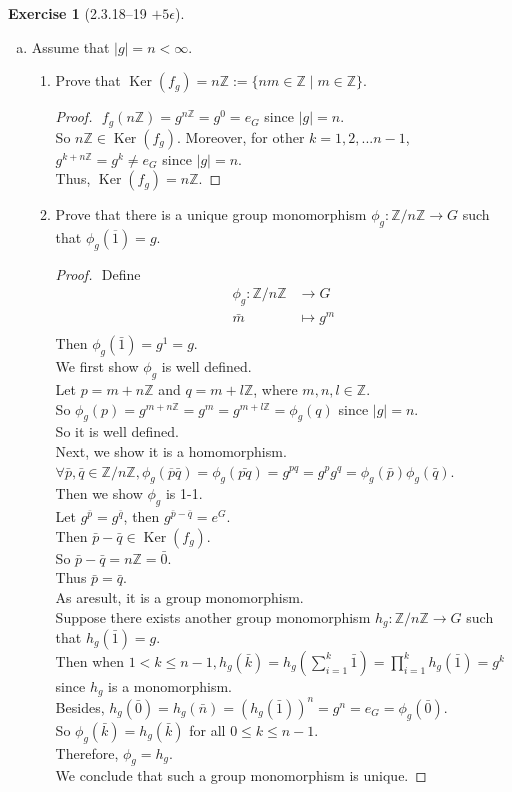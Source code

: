 \documentclass{amsart}
\newcommand{\bbz}{\mathbb{Z}}
\renewcommand{\ker}{\operatorname{Ker}}
\theoremstyle{plain}
\theoremstyle{definition}
\newtheorem{exer}[lem]{Exercise}
\begin{document}
\begin{exer}[2.3.18--19 $+5\epsilon$]
\begin{enumerate}[(a)]
\item Assume that $|g|=n<\infty$.
\begin{enumerate}[(1)]
\item Prove that $\ker(f_g)=n\bbz:=\{nm\in\bbz\mid m\in\bbz\}$.
	\begin{proof}
		$ $\newline
		$f_g(n\bbz) = g^{n\bbz} = g^0 = e_G$ since $|g| = n$.\\
		So $n\bbz \in \ker(f_g)$.
		Moreover, for other $k = 1,2,...n-1$, $g^{k+n\bbz} = g^k \neq e_G$ since $|g| = n$.\\
		Thus, $\ker(f_g) = n\bbz$.
	\end{proof}
\item Prove that 
there is a unique group monomorphism $\phi_g\colon\bbz/n\bbz\to G$ such that $\phi_g(\overline 1)=g$. 
\begin{proof}
	$ $\newline
	Define
	\begin{align*}
		\phi_g:\bbz / n \bbz & \to G \\
		\bar{m} & \mapsto g^{m} \\
	\end{align*}
	Then $\phi_g(\bar{1}) = g^{1} = g$. \\
	We first show $\phi_g$ is well defined. \\
	Let $p = m + n\bbz$ and $q = m + l\bbz$, where $m, n,l \in \bbz$. \\
	So $\phi_g(p) = g^{m+n\bbz} = g^m = g^{m+l\bbz} = \phi_g(q)$ since $|g| = n $.\\
	So it is well defined.\\
	Next, we show it is a homomorphism. \\
	$\forall \bar{p}, \bar{q} \in \bbz/n\bbz, \phi_g(\overline{p}\bar{q}) = \phi_g(\bar{pq}) = g^{pq} = g^pg^q = \phi_g(\bar{p})\phi_g(\bar{q})$.\\
	Then we show $\phi_g$ is 1-1.\\ 
	Let $g^{\bar{p}} = g^{\bar{q}}$, then $g^{\bar{p} - \bar{q}} = e^G$.\\
	Then $\bar{p} - \bar{q} \in \ker(f_g)$.\\
	So $\bar{p} - \bar{q} = n\bbz = \bar{0}$.\\
	Thus $\bar{p} = \bar{q}$. \\ 
	As aresult, it is a group monomorphism. \\ 
	Suppose there exists another group monomorphism $h_g\colon\bbz/n\bbz\to G$ such that $h_g(\bar{1}) = g$.\\
	Then when $1 < k \leq n-1, h_g(\bar{k}) = h_g(\sum_{i=1}^k \bar{1}) = \prod_{i=1}^k h_g(\bar{1}) = g^k$ since $h_g$ is a monomorphism.\\
	Besides, $h_g(\bar{0}) = h_g(\bar{n}) = (h_g(\bar{1}))^n = g^n = e_G = \phi_g(\bar{0})$.\\
	So $\phi_g(\bar{k}) = h_g(\bar{k})$ for all $0 \leq k \leq n-1$.\\
	Therefore, $\phi_g = h_g$.\\
	We conclude that such a group monomorphism is unique.
\end{proof}


\end{enumerate}
\end{enumerate}
\end{exer}
\end{document}
